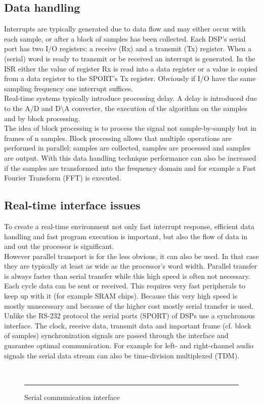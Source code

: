 \subsection{Data handling} Interrupts are typically generated due to data flow and may either occur with each sample, or after a block of samples has been collected. Each DSP's serial port has two I/O registers: a receive (Rx) and a transmit (Tx) register. When a (serial) word is ready to transmit or be received an interrupt is generated. In the ISR either the value of register Rx is read into a data register or a value is copied from a data register to the SPORT's Tx register. Obviously if I/O have the same sampling frequency one interrupt suffices. \\
Real-time systems typically introduce processing delay. A delay is introduced due to the A/D and D\textbackslash A converter, the execution of the algorithm on the samples and by block processing. \\
The idea of block processing is to process the signal not sample-by-samply but in frames of n samples. Block processing allows that multiple operations are performed in parallel: samples are collected, samples are processed and samples are output. With this data handling technique performance can also be increased if the samples are transformed into the frequency domain and for example a Fast Fourier Transform (FFT) is executed.
\subsection{Real-time interface issues} To create a real-time environment not only fast interrupt response, efficient data handling and fast program execution is important, but also the flow of data in and out the processor is significant. \\ However parallel transport is for the less obvious, it can also be used. In that case they are typically at least as wide as the processor's word width. Parallel transfer is always faster than serial transfer while this high speed is often not necessary.  Each cycle data can be sent or received. This requires very fast peripherals to keep up with it (for example SRAM chips). Because this very high speed is mostly unnecessary and because of the higher cost mostly serial transfer is used. \\
Unlike the RS-232 protocol the serial ports (SPORT) of DSPs use a synchronous interface. The clock, receive data, transmit data and important frame (cf. block of samples) synchronization signals are passed through the interface and guarantee optimal communication. For example for left- and right-channel audio signals the serial data stream can also be time-division multiplexed (TDM).
\begin{figure}[htbp]
   \centerline{\hbox{
   \epsfxsize=2.8cm
     }
  }
  \rule{30em}{0.5pt}
  \centering
  \caption{Serial communication interface}
  \label{fig:serial}
\end{figure}
